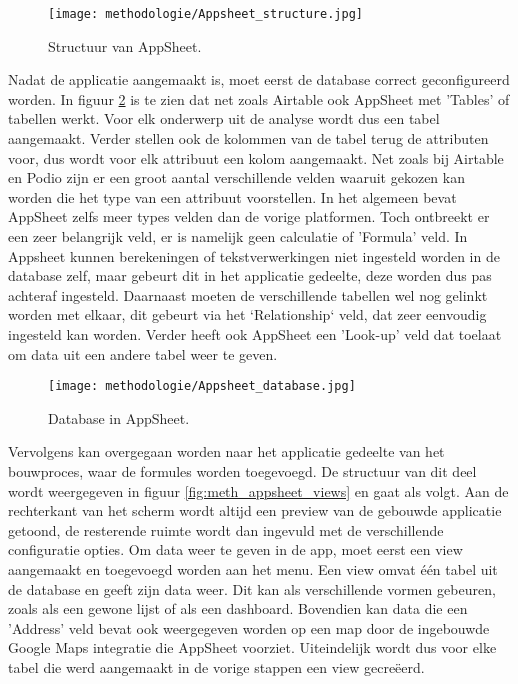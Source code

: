 \begin{figure}[h]
    \centering
    \texttt{[image: methodologie/Appsheet\_structure.jpg]}
    \caption{Structuur van AppSheet.}
    \label{fig:meth_appsheet_structuur}
\end{figure}

Nadat de applicatie aangemaakt is, moet eerst de database correct geconfigureerd worden. In figuur \ref{fig:meth_appsheet_database} is te zien dat net zoals Airtable ook AppSheet met 'Tables' of tabellen werkt. Voor elk onderwerp uit de analyse wordt dus een tabel aangemaakt. Verder stellen ook de kolommen van de tabel terug de attributen voor, dus wordt voor elk attribuut een kolom aangemaakt. Net zoals bij Airtable en Podio zijn er een groot aantal verschillende velden waaruit gekozen kan worden die het type van een attribuut voorstellen. In het algemeen bevat AppSheet zelfs meer types velden dan de vorige platformen. Toch ontbreekt er een zeer belangrijk veld, er is namelijk geen calculatie of 'Formula' veld. In Appsheet kunnen berekeningen of tekstverwerkingen niet ingesteld worden in de database zelf, maar gebeurt dit in het applicatie gedeelte, deze worden dus pas achteraf ingesteld. Daarnaast moeten de verschillende tabellen wel nog gelinkt worden met elkaar, dit gebeurt via het `Relationship` veld, dat zeer eenvoudig ingesteld kan worden. Verder heeft ook AppSheet een 'Look-up' veld dat toelaat om data uit een andere tabel weer te geven.

\begin{figure}[h]
    \centering
    \texttt{[image: methodologie/Appsheet\_database.jpg]}
    \caption{Database in AppSheet.}
    \label{fig:meth_appsheet_database}
\end{figure}

Vervolgens kan overgegaan worden naar het applicatie gedeelte van het bouwproces, waar de formules worden toegevoegd. De structuur van dit deel wordt weergegeven in figuur \ref{fig:meth_appsheet_views} en gaat als volgt. Aan de rechterkant van het scherm wordt altijd een preview van de gebouwde applicatie getoond, de resterende ruimte wordt dan ingevuld met de verschillende configuratie opties. Om data weer te geven in de app, moet eerst een view aangemaakt en toegevoegd worden aan het menu. Een view omvat één tabel uit de database en geeft zijn data weer. Dit kan als verschillende vormen gebeuren, zoals als een gewone lijst of als een dashboard. Bovendien kan data die een 'Address' veld bevat ook weergegeven worden op een map door de ingebouwde Google Maps integratie die AppSheet voorziet. Uiteindelijk wordt dus voor elke tabel die werd aangemaakt in de vorige stappen een view gecreëerd. \\


